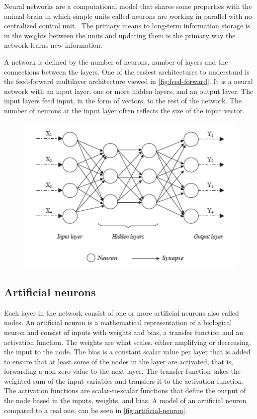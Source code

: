Neural networks are a computational model that shares some properties with the animal brain in which simple units called neurons are working in parallel with no centralized control unit \cite{Patterson2017}. The primary means to long-term information storage is in the weights between the units and updating them is the primary way the network learns new information.

A network is defined by the number of neurons, number of layers and the connections between the layers. One of the easiest architectures to understand is the feed-forward multilayer architecture viewed in \autoref{fig:feed-forward}. It is a neural network with an input layer, one or more hidden layers, and an output layer. The input layers feed input, in the form of vectors, to the rest of the network. The number of neurons at the input layer often reflects the size of the input vector.

\begin{figure}[H]
    \centering
    \includegraphics[width=0.8\linewidth]{fig/feedforward-neural-network.png}
    \label{fig:feed-forward}
\end{figure}

\subsection{Artificial neurons}
Each layer in the network consist of one or more artificial neurons also called nodes. An artificial neuron is a mathematical representation of a biological neuron and consist of inputs with weights and bias, a transfer function and an activation function. The weights are what scales, either amplifying or decreasing, the input to the node. The bias is a constant scalar value per layer that is added to ensure that at least some of the nodes in the layer are activated, that is, forwarding a non-zero value to the next layer. The transfer function takes the weighted sum of the input variables and transfers it to the activation function. The activation functions are scalar-to-scalar functions that define the output of the node based in the inputs, weights, and bias. A model of an artificial neuron compared to a real one, can be seen in \autoref{fig:artificial-neuron}. 


